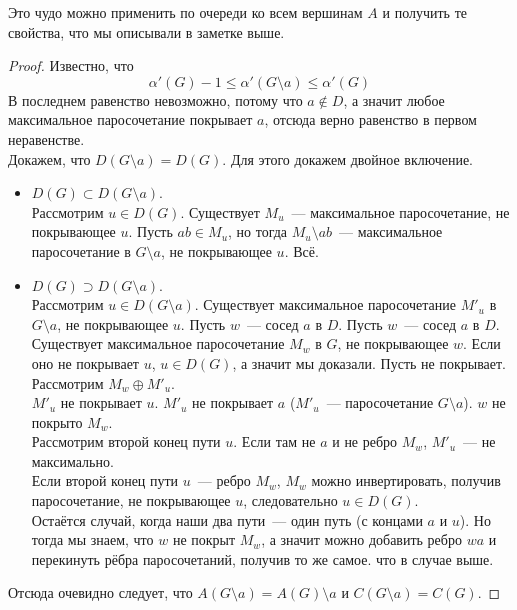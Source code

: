 \documentclass{article}
\begin{document}
    \begin{remark}
        Это чудо можно применить по очереди ко всем вершинам $A$ и получить те свойства, что мы описывали в заметке выше.
    \end{remark}
    \begin{proof}
        Известно, что
        $$
        \alpha'(G)-1\leqslant\alpha'(G\setminus a)\leqslant\alpha'(G)
        $$
        В последнем равенство невозможно, потому что $a\notin D$, а значит любое максимальное паросочетание покрывает $a$, отсюда верно равенство в первом неравенстве.\\
        Докажем, что $D(G\setminus a)=D(G)$. Для этого докажем двойное включение.
        \begin{itemize}
            \item $D(G)\subset D(G\setminus a)$.\\
            Рассмотрим $u\in D(G)$. Существует $M_u$~--- максимальное паросочетание, не покрывающее $u$. Пусть $ab\in M_u$, но тогда $M_u\setminus ab$~--- максимальное паросочетание в $G\setminus a$, не покрывающее $u$. Всё.
            \item $D(G)\supset D(G\setminus a)$.\\
            Рассмотрим $u\in D(G\setminus a)$. Существует максимальное паросочетание $M'_u$ в $G\setminus a$, не покрывающее $u$. Пусть $w$~--- сосед $a$ в $D$. Пусть $w$~--- сосед $a$ в $D$. Существует максимальное паросочетание $M_w$ в $G$, не покрывающее $w$. Если оно не покрывает $u$, $u\in D(G)$, а значит мы доказали. Пусть не покрывает. Рассмотрим $M_w\oplus M'_u$.\\
            $M'_u$ не покрывает $u$. $M'_u$ не покрывает $a$ ($M'_u$~--- паросочетание $G\setminus a$). $w$ не покрыто $M_w$.\\
            Рассмотрим второй конец пути $u$. Если там не $a$ и не ребро $M_w$, $M'_u$~--- не максимально.\\
            Если второй конец пути $u$~--- ребро $M_w$, $M_w$ можно инвертировать, получив паросочетание, не покрывающее $u$, следовательно $u\in D(G)$.\\
            Остаётся случай, когда наши два пути~--- один путь (с концами $a$ и $u$). Но тогда мы знаем, что $w$ не покрыт $M_w$, а значит можно добавить ребро $wa$ и перекинуть рёбра паросочетаний, получив то же самое. что в случае выше.
        \end{itemize}
        Отсюда очевидно следует, что $A(G\setminus a)=A(G)\setminus a$ и $C(G\setminus a)=C(G)$.
    \end{proof}
\end{document}
